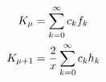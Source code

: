 \documentclass[12pt]{article}
\begin{document}
\begin{align}
K_\mu &= \sum_{k=0}^\infty c_k f_k \notag \\
K_{\mu+1} &= \frac{2}{x}\sum_{k=0}^\infty c_k h_k \notag
\end{align}
\end{document}
